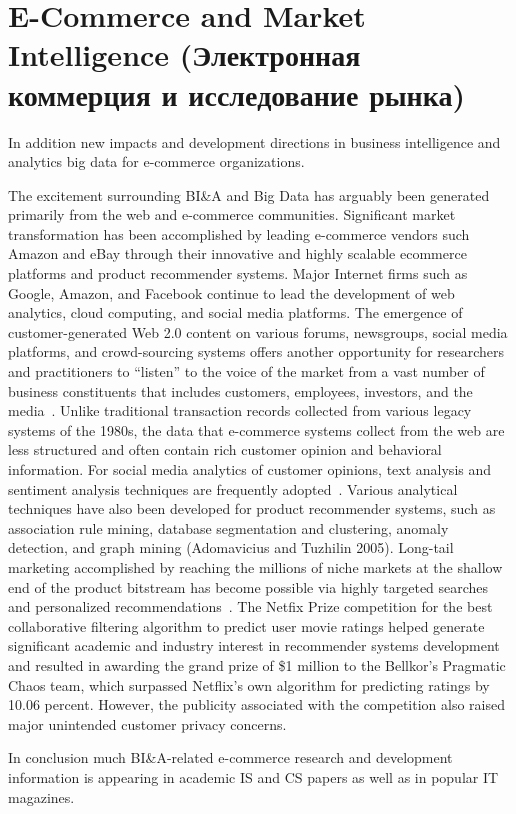 \section{E-Commerce and Market Intelligence (Электронная коммерция и исследование рынка)}
In addition new impacts and development directions in business intelligence and analytics big data for e-commerce organizations.

The excitement surrounding BI\&A and Big Data has arguably
been generated primarily from the web and e-commerce
communities. Significant market transformation has been
accomplished by leading e-commerce vendors such Amazon
and eBay through their innovative and highly scalable ecommerce
platforms and product recommender systems.
Major Internet firms such as Google, Amazon, and Facebook
continue to lead the development of web analytics, cloud
computing, and social media platforms. The emergence of
customer-generated Web 2.0 content on various forums,
newsgroups, social media platforms, and crowd-sourcing
systems offers another opportunity for researchers and practitioners to “listen” to the voice of the market from a vast
number of business constituents that includes customers, employees,
investors, and the media~\cite{OReilly:2005}. Unlike traditional transaction records collected from
various legacy systems of the 1980s, the data that e-commerce
systems collect from the web are less structured and often
contain rich customer opinion and behavioral information.
For social media analytics of customer opinions, text analysis
and sentiment analysis techniques are frequently adopted~\cite{Lin:2011}. Various analytical techniques have also
been developed for product recommender systems, such as
association rule mining, database segmentation and clustering,
anomaly detection, and graph mining (Adomavicius and
Tuzhilin 2005). Long-tail marketing accomplished by
reaching the millions of niche markets at the shallow end of
the product bitstream has become possible via highly targeted
searches and personalized recommendations~\cite{Wactlar:2011}.
The Netfix Prize competition for the best collaborative
filtering algorithm to predict user movie ratings helped generate
significant academic and industry interest in recommender
systems development and resulted in awarding the grand prize
of \$1 million to the Bellkor’s Pragmatic Chaos team, which
surpassed Netflix’s own algorithm for predicting ratings by
10.06 percent. However, the publicity associated with the
competition also raised major unintended customer privacy
concerns.

In conclusion much BI\&A-related e-commerce research and development
information is appearing in academic IS and CS papers as
well as in popular IT magazines.